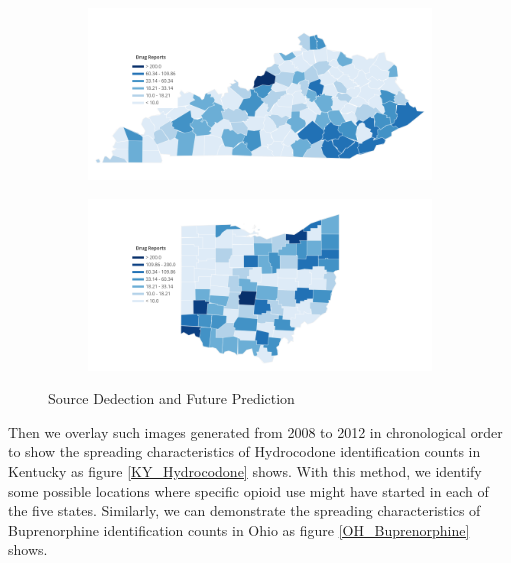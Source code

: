 \documentclass{mcmthesis}
\begin{document}
\begin{figure}[H]
    \centering
    \begin{subfigure}[b]{0.49\textwidth}
        \includegraphics[width=\textwidth]{../figure/KY_Hydrocodone_5}  
	\label{KY_Hydrocodone_5}  
    \end{subfigure}
    \begin{subfigure}[b]{0.49\textwidth}
        \includegraphics[width=\textwidth]{../figure/OH_Buprenorphine_1}  
	\label{OH}
    \end{subfigure}
    \caption{ Source Dedection and Future Prediction  }\label{fig:fancy}
\end{figure}



Then we overlay such images generated from 2008 to 2012 in chronological order to show the spreading characteristics of Hydrocodone identification counts in Kentucky as figure \ref{KY_Hydrocodone} shows. With this method, we identify some  possible locations where specific opioid use might have started in each of the five states. Similarly, we can demonstrate the spreading characteristics of Buprenorphine identification counts in Ohio as figure \ref{OH_Buprenorphine} shows.
\end{document}
